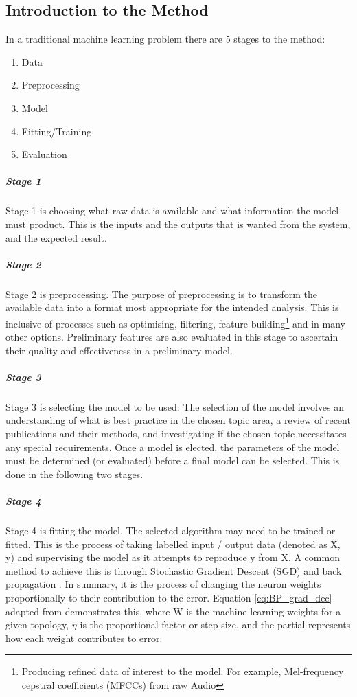 \documentclass{UoNMCHA}
\newcommand{\eref}[1] {Equation \ref{#1}}
\numberwithin{equation}{section}
\begin{document}
\subsection{Introduction to the Method}
In a traditional machine learning problem there are 5 stages to the method: 
\begin{enumerate}
    \item Data
    \item Preprocessing
    \item Model
    \item Fitting/Training
    \item Evaluation
\end{enumerate}

\subparagraph{Stage 1}
Stage 1 is choosing what raw data is available and what information the model must product. This is the inputs and the outputs that is wanted from the system, and the expected result.

\subparagraph{Stage 2}
Stage 2 is preprocessing. The purpose of preprocessing is to transform the available data into a format most appropriate for the intended analysis. This is inclusive of processes such as optimising, filtering, feature building\footnote{Producing refined data of interest to the model. For example, Mel-frequency cepstral coefficients (MFCCs) from raw Audio} and in many other options. Preliminary features are also evaluated in this stage to ascertain their quality and effectiveness in a preliminary model.

\subparagraph{Stage 3}
Stage 3 is selecting the model to be used. The selection of the model involves an understanding of what is best practice in the chosen topic area, a review of recent publications and their methods, and investigating if the chosen topic necessitates any special requirements. Once a model is elected, the parameters of the model must be determined (or evaluated) before a final model can be selected. This is done in the following two stages.

\subparagraph{Stage 4}
Stage 4 is fitting the model. The selected algorithm may need to be trained or fitted. This is the process of taking labelled input / output data (denoted as X, y) and supervising the model as it attempts to reproduce y from X. A common method to achieve this is through Stochastic Gradient Descent (SGD) and back propagation \cite{lecun2012efficient}. In summary, it is the process of changing the neuron weights proportionally to their contribution to the error. \eref{eq:BP_grad_dec} adapted from \cite{lecun2012efficient} demonstrates this, where W is the machine learning weights for a given topology, $\eta$ is the proportional factor or step size, and the partial represents how each weight contributes to error.\\
\end{document}
